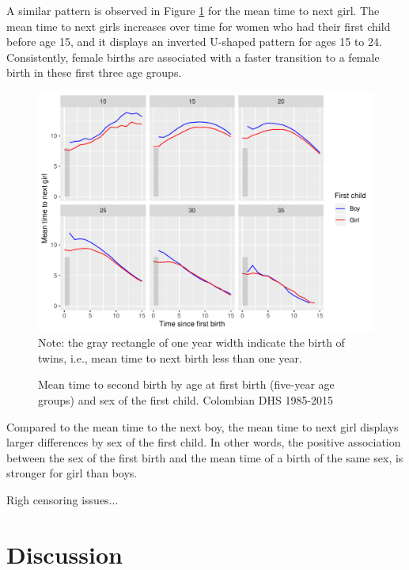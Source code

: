 \documentclass{article}
\begin{document}
A similar pattern is observed in Figure \ref{fert_03} for the mean time to next girl. The mean time to next girls increases over time for women who had their first child before age 15, and it displays an inverted U-shaped pattern for ages 15 to 24. Consistently, female births are associated with a faster transition to a female birth in these first three age groups.

\begin{figure}[H]
    \centering
    \caption{Mean time to second birth by age at first birth (five-year age groups) and sex of the first child. Colombian DHS 1985-2015}
    \includegraphics[scale=0.8]{Spells/Figures/mt_second_gir_by_sex_first_cohort.pdf}\\
    \label{fert_03}
    Note: the gray rectangle of one year width indicate the birth of twins, i.e., mean time to next birth less than one year.
\end{figure}

Compared to the mean time to the next boy, the mean time to next girl displays larger differences by sex of the first child. In other words, the positive association between the sex of the first birth and the mean time of a birth of the same sex, is stronger for girl than boys.

Righ censoring issues...

\section{Discussion}
\end{document}
